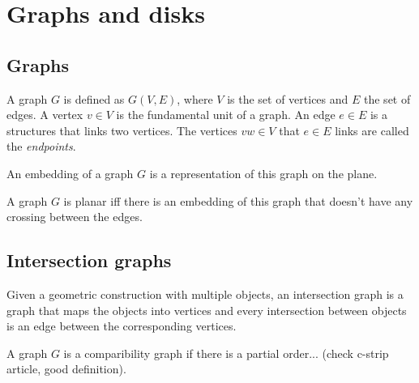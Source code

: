 \chapter{Graphs and disks}


\section{Graphs}

A graph $G$ is defined as $G(V,E)$, where $V$ is the set of vertices and $E$ the set of edges. A vertex $v \in V$ is the fundamental unit of a graph. An edge $e \in E$ is a structures that links two vertices. The vertices $vw \in V$ that $e \in E$ links are called the \textit{endpoints}.

\begin{definition}
  An embedding of a graph $G$ is a representation of this graph on the plane.
\end{definition}

\begin{definition}
  A graph $G$ is planar iff there is an embedding of this graph that doesn't have any crossing between the edges.
\end{definition}


\section{Intersection graphs}

%

Given a geometric construction with multiple objects, an intersection graph is a graph that maps the objects into vertices and every intersection between objects is an edge between the corresponding vertices.

\begin{definition}
  A graph $G$ is a comparibility graph if there is a partial order... (check c-strip article, good definition).
\end{definition}

